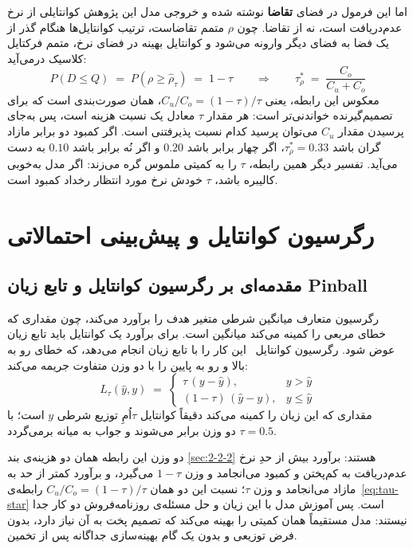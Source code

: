 اما این فرمول در فضای \textbf{تقاضا} نوشته شده و خروجی مدل این پژوهش کوانتایلی از نرخ
عدم‌دریافت است، نه از تقاضا. چون $\rho$ متمم تقاضاست، ترتیب کوانتایل‌ها هنگام گذر از یک
فضا به فضای دیگر وارونه می‌شود و کوانتایل بهینه در فضای نرخ، متمم فرکتایل کلاسیک
درمی‌آید:
\begin{equation}
P(D \le Q) \;=\; P(\rho \ge \hat\rho_\tau) \;=\; 1-\tau
\qquad\Longrightarrow\qquad
\tau^{*}_{\rho} \;=\; \frac{C_o}{C_u + C_o}
\label{eq:tau-star}
\end{equation}
معکوس این رابطه، یعنی $C_u/C_o = (1-\tau)/\tau$، همان صورت‌بندی است که برای
تصمیم‌گیرنده خواندنی‌تر است: هر مقدار $\tau$ معادل یک نسبت هزینه است، پس به‌جای پرسیدن
مقدار $C_u$ می‌توان پرسید کدام نسبت پذیرفتنی است. اگر کمبود دو برابر مازاد گران باشد
$\tau^{*}_{\rho} = 0.33$، اگر چهار برابر باشد $0.20$ و اگر نُه برابر باشد $0.10$ به دست
می‌آید. تفسیر دیگر همین رابطه، $\tau$ را به کمیتی ملموس گره می‌زند: اگر مدل به‌خوبی
کالیبره باشد، $\tau$ خودش نرخ مورد انتظار رخداد کمبود است.

\section{رگرسیون کوانتایل و پیش‌بینی احتمالاتی}
\label{sec:2-3}

\subsection{مقدمه‌ای بر رگرسیون کوانتایل و تابع زیان Pinball}
\label{sec:2-3-1}

رگرسیون متعارف میانگین شرطی متغیر هدف را برآورد می‌کند، چون مقداری که خطای مربعی را
کمینه می‌کند میانگین است. برای برآورد یک کوانتایل باید تابع زیان عوض شود. رگرسیون
کوانتایل~\cite{KoenkerBassett78quantreg} این کار را با
تابع زیان  انجام می‌دهد، که خطای رو به بالا و رو به پایین را با دو وزن
متفاوت جریمه می‌کند:
\begin{equation}
L_\tau(\hat y, y) \;=\;
\begin{cases}
\tau\,(y-\hat y), & y > \hat y \\[2pt]
(1-\tau)\,(\hat y-y), & y \le \hat y
\end{cases}
\label{eq:pinball}
\end{equation}
مقداری که این زیان را کمینه می‌کند دقیقاً کوانتایل $\tau$اُمِ توزیع شرطی $y$ است؛ با
$\tau = 0.5$ دو وزن برابر می‌شوند و جواب به میانه برمی‌گردد.

دو وزن این رابطه همان دو هزینه‌ی بند \ref{sec:2-2-2} هستند: برآورد بیش از حدِ نرخ
عدم‌دریافت به کم‌پختن و کمبود می‌انجامد و وزن $1-\tau$ می‌گیرد، و برآورد کمتر از حد به
مازاد می‌انجامد و وزن $\tau$؛ نسبت این دو همان $C_u/C_o = (1-\tau)/\tau$ رابطه‌ی~\ref{eq:tau-star}
است. پس آموزش مدل با این زیان و حل مسئله‌ی روزنامه‌فروش دو کار جدا نیستند: مدل مستقیماً
همان کمیتی را بهینه می‌کند که تصمیم پخت به آن نیاز دارد، بدون فرض توزیعی و بدون یک گام
بهینه‌سازی جداگانه پس از تخمین.

